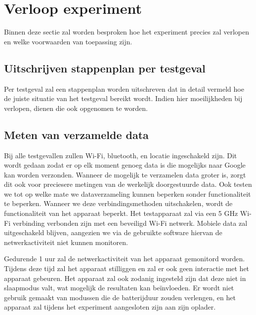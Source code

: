 \section{Verloop experiment}
\label{sec:conditionsexperiment}
Binnen deze sectie zal worden besproken hoe het experiment precies zal verlopen en welke voorwaarden van toepassing zijn.

\subsection{Uitschrijven stappenplan per testgeval}
Per testgeval zal een stappenplan worden uitschreven dat in detail vermeld hoe de juiste situatie van het testgeval bereikt wordt. Indien hier moeilijkheden bij verlopen, dienen die ook opgenomen te worden.

\subsection{Meten van verzamelde data}
Bij alle testgevallen zullen Wi-Fi, bluetooth, en locatie ingeschakeld zijn. Dit wordt gedaan zodat er op elk moment genoeg data is die mogelijks naar Google kan worden verzonden. Wanneer de mogelijk te verzamelen data groter is, zorgt dit ook voor preciesere metingen van de werkelijk doorgestuurde data. Ook  testen we tot op welke mate we dataverzameling kunnen beperken sonder functionaliteit te beperken. Wanneer we deze verbindingsmethoden uitschakelen, wordt de functionaliteit van het apparaat beperkt. Het testapparaat zal via een 5 GHz Wi-Fi verbinding verbonden zijn met een beveiligd Wi-Fi netwerk. Mobiele data zal uitgeschakeld blijven, aangezien we via de gebruikte software hiervan de netwerkactiviteit niet kunnen monitoren.

Gedurende 1 uur zal de netwerkactiviteit van het apparaat gemonitord worden. Tijdens deze tijd zal het apparaat stilliggen en zal er ook geen interactie met het apparaat gebeuren. Het apparaat zal ook zodanig ingesteld zijn dat deze niet in slaapmodus valt, wat mogelijk de resultaten kan beïnvloeden. Er wordt niet gebruik gemaakt van modussen die de batterijduur zouden verlengen, en het apparaat zal tijdens het experiment aangesloten zijn aan zijn oplader.




